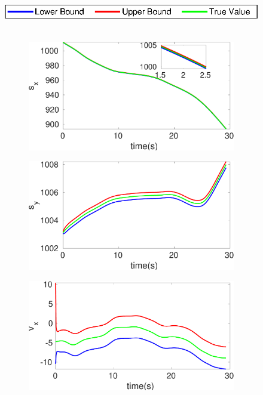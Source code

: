 \begin{figure}[h]
\hspace*{\fill} \includegraphics[scale=0.8]{figures/legend}\\\\
\begin{subfigure}{.5\linewidth}
\centering
\includegraphics[width=\linewidth]{figures/Frad/s3cvSMs_x}
\end{subfigure}
\begin{subfigure}{.5\linewidth}
\centering
\includegraphics[width=\linewidth]{figures/Frad/s3cvSMs_y}
\end{subfigure}
\begin{subfigure}{.5\linewidth}
\centering
\includegraphics[width=\linewidth]{figures/Frad/s3cvSMv_x}

\end{subfigure}
\end{figure}

